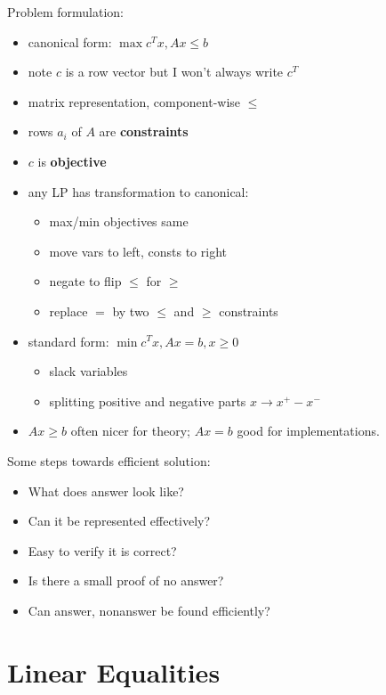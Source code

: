 \documentclass{article}
\begin{document}
Problem formulation:
\begin{itemize}
\item canonical form: $\max c^Tx, Ax \le b$
\item note $c$ is a row vector but I won't always write $c^T$
\item matrix representation, component-wise $\le$
\item rows $a_i$ of $A$ are {\bf constraints}
\item $c$ is {\bf objective}
\item any LP has transformation to canonical:
  \begin{itemize}
  \item max/min objectives same
  \item move vars to left, consts to right
  \item negate to flip $\le$ for $\ge$
  \item replace $=$ by two $\le$ and $\ge$ constraints
  \end{itemize}
\item standard form: $\min c^Tx, Ax=b, x\ge 0$
  \begin{itemize}
  \item slack variables
  \item splitting positive and negative parts $x \rightarrow x^+-x^-$
  \end{itemize}
\item $Ax \ge b$ often nicer for theory; $Ax=b$ good for
  implementations.
\end{itemize}


Some steps towards efficient solution:
\begin{itemize}
\item What does answer look like?
\item Can it be represented effectively?
\item Easy to verify it is correct?
\item Is there a small proof of no answer?
\item Can answer, nonanswer be found efficiently?
\end{itemize}

\section{Linear Equalities}
\end{document}
